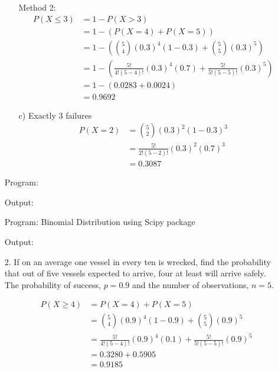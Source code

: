 \documentclass[a4paper,11pt,openright]{report}
\begin{document}
\begin{enumerate}
\begin{enumerate}
Method 2:
\begin{equation*}
\begin{split}
		P(X \leq 3) & = 1 - P(X > 3) \\
		& = 1 - (P(X = 4) + P(X = 5)) \\
		& = 1 - \left( \binom 54 (0.3)^{4} (1-0.3) + \binom 55 (0.3)^{5} \right) \\
		& = 1 - \left( \frac{5!}{4! (5-4)!} (0.3)^{4} (0.7) + \frac{5!}{5! (5-5)!} (0.3)^{5} \right) \\
		& = 1 - (0.0283 + 0.0024) \\
		& = 0.9692
\end{split}
\end{equation*}

\pagebreak

\item[c)] Exactly $3$ failures \\
\begin{equation*}
\begin{split}
		P(X = 2) & = \binom 52 (0.3)^{2} (1-0.3)^{3} \\
		& = \frac{5!}{2! (5-2)!} (0.3)^{2} (0.7)^{3} \\
		& = 0.3087
\end{split}
\end{equation*}

\end{enumerate}

Program:


\pagebreak

Output:


\vspace{1cm}

Program: Binomial Distribution using Scipy package


Output:


\item[2.] If on an average one vessel in every ten is wrecked, find the probability that out
of five vessels expected to arrive, four at least will arrive safely. \\

The probability of success, $p = 0.9$ and the number of observations, $n = 5$.

\begin{equation*}
\begin{split}
		P(X \geq 4) & = P(X = 4) + P(X = 5) \\
		& = \binom 54 (0.9)^{4} (1-0.9) + \binom 55 (0.9)^{5} \\
		& = \frac{5!}{4! (5-4)!} (0.9)^{4} (0.1) + \frac{5!}{5! (5-5)!} (0.9)^{5} \\
		& = 0.3280 + 0.5905 \\
		& = 0.9185
\end{split}
\end{equation*}


\end{enumerate}
\end{document}
